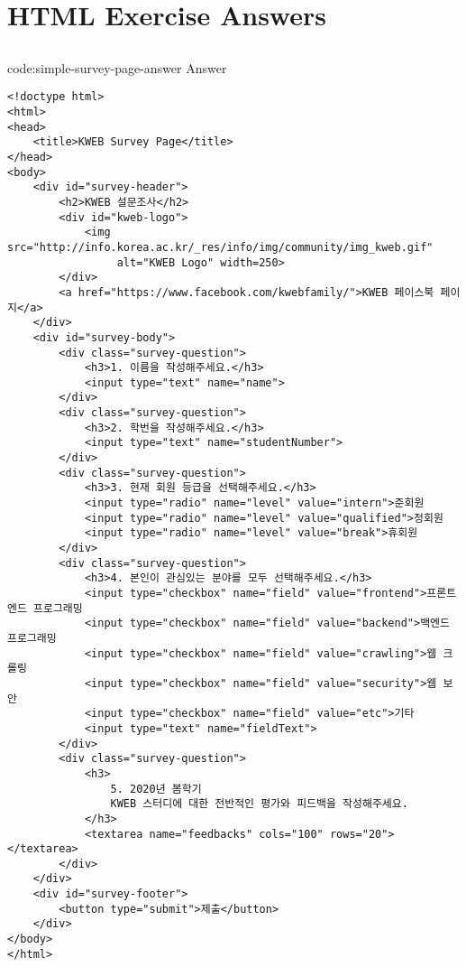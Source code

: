 \section{HTML Exercise Answers}\label{sect:html-exercise-answers}

\subsection*{}

\begin{codeenv}{code:simple-survey-page-answer}{ Answer}\begin{verbatim}
<!doctype html>
<html>
<head>
    <title>KWEB Survey Page</title>
</head>
<body>
    <div id="survey-header">
        <h2>KWEB 설문조사</h2>
        <div id="kweb-logo">
            <img src="http://info.korea.ac.kr/_res/info/img/community/img_kweb.gif"
                 alt="KWEB Logo" width=250>
        </div>
        <a href="https://www.facebook.com/kwebfamily/">KWEB 페이스북 페이지</a>
    </div>
    <div id="survey-body">
        <div class="survey-question">
            <h3>1. 이름을 작성해주세요.</h3>
            <input type="text" name="name">
        </div>
        <div class="survey-question">
            <h3>2. 학번을 작성해주세요.</h3>
            <input type="text" name="studentNumber">
        </div>
        <div class="survey-question">
            <h3>3. 현재 회원 등급을 선택해주세요.</h3>
            <input type="radio" name="level" value="intern">준회원
            <input type="radio" name="level" value="qualified">정회원
            <input type="radio" name="level" value="break">휴회원
        </div>
        <div class="survey-question">
            <h3>4. 본인이 관심있는 분야를 모두 선택해주세요.</h3>
            <input type="checkbox" name="field" value="frontend">프론트엔드 프로그래밍
            <input type="checkbox" name="field" value="backend">백엔드 프로그래밍
            <input type="checkbox" name="field" value="crawling">웹 크롤링
            <input type="checkbox" name="field" value="security">웹 보안
            <input type="checkbox" name="field" value="etc">기타
            <input type="text" name="fieldText">
        </div>
        <div class="survey-question">
            <h3>
                5. 2020년 봄학기
                KWEB 스터디에 대한 전반적인 평가와 피드백을 작성해주세요.
            </h3>
            <textarea name="feedbacks" cols="100" rows="20"></textarea>
        </div>
    </div>
    <div id="survey-footer">
        <button type="submit">제출</button>
    </div>
</body>
</html>
\end{verbatim}
\end{codeenv}
